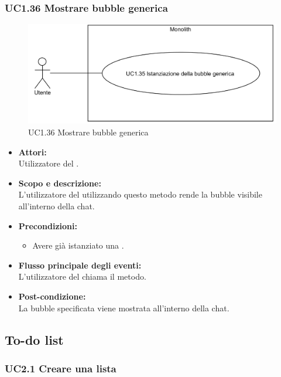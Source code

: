 \subsubsection{UC1.36 Mostrare bubble generica} \label{UC1.36}

\begin{figure}[H]
	\centering
	\includegraphics[width=15cm]{../../documenti/AnalisiDeiRequisiti/Diagrammi_img/uc1_36.png}
	\caption{UC1.36 Mostrare bubble generica}
\end{figure}

\begin{itemize}
	\item \textbf{Attori:}
	\\Utilizzatore del .
	\item \textbf{Scopo e descrizione:} 
	\\L’utilizzatore del  utilizzando questo metodo rende la bubble visibile all'interno della chat.
	\item \textbf{Precondizioni:}
	\begin{itemize}
		\item Avere già istanziato una .
	\end{itemize}
	\item \textbf{Flusso principale degli eventi:}
	\\L’utilizzatore del  chiama il metodo.
	\item \textbf{Post-condizione:}
	\\La bubble specificata viene mostrata all'interno della chat.
\end{itemize}

\subsection{To-do list}

\subsubsection{UC2.1 Creare una lista} \label{UC2.1}


